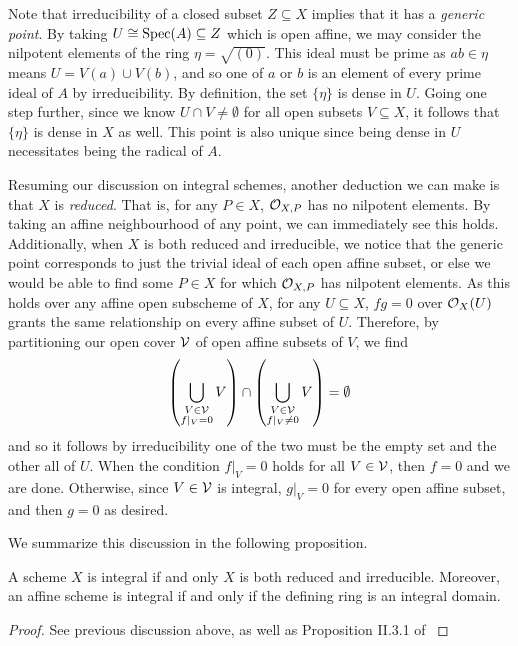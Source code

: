 Note that irreducibility of a closed subset $Z \subseteq X$ implies that it has a \textit{generic point}.
By taking $U \cong {\rm Spec}(A) \subseteq Z$ which is open affine,
we may consider the nilpotent elements of the ring $\eta = \sqrt{(0)}$.
This ideal must be prime as $ab \in \eta$ means $U = V(a) \cup V(b)$,
and so one of $a$ or $b$ is an element of every prime ideal of $A$ by irreducibility.
By definition, the set $\{ \eta \}$ is dense in $U$.
Going one step further, since we know $U \cap V \neq \emptyset$ for all open subsets $V \subseteq X$,
it follows that $\{ \eta \}$ is dense in $X$ as well. 
This point is also unique since being dense in $U$ necessitates being the radical of $A$.

Resuming our discussion on integral schemes,
another deduction we can make is that $X$ is \textit{reduced}.
That is, for any $P \in X$, $\mathcal{O}_{X,P}$ has no nilpotent elements.
By taking an affine neighbourhood of any point, we can immediately see this holds.
Additionally, when $X$ is both reduced and irreducible,
we notice that the generic point corresponds to just the trivial ideal of each open affine subset,
or else we would be able to find some $P \in X$ for which $\mathcal{O}_{X, P}$ has nilpotent elements.
As this holds over any affine open subscheme of $X$, for any $U \subseteq X$,
$fg = 0$ over $\mathcal{O}_X(U)$ grants the same relationship on every affine subset of $U$.
Therefore, by partitioning our open cover $\mathcal{V}$ of open affine subsets of $V$, we find
\[
    \left(\bigcup_{\substack{V \in \mathcal{V} \\ f|_V = 0}} V \right)
    \cap \left(\bigcup_{\substack{V \in \mathcal{V} \\ f|_V \neq 0}} V \right)
    = \emptyset
\]
and so it follows by irreducibility one of the two must be the empty set and the other all of $U$. 
When the condition $f|_V = 0$ holds for all $V \in \mathcal{V}$, then $f = 0$ and we are done.
Otherwise, since $V \in \mathcal{V}$ is integral, $g|_V = 0$ for every open affine subset,
and then $g = 0$ as desired.

We summarize this discussion in the following proposition.

\begin{proposition}
    A scheme $X$ is integral if and only $X$ is both reduced and irreducible.
    Moreover, an affine scheme is integral if and only if the defining ring is an integral domain.
\end{proposition}
\begin{proof}
    See previous discussion above, 
    as well as Proposition II.3.1 of \cite{Hartshorne_2013}
\end{proof}


